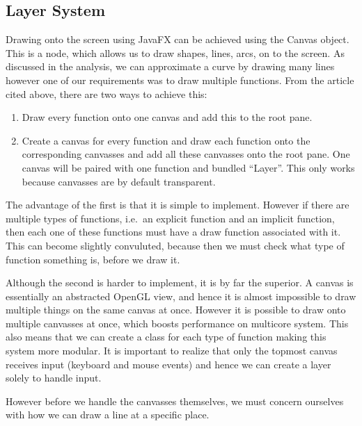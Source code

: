 \documentclass[../../../../../main.tex]{subfiles}
\begin{document}
\subsection{Layer System}
Drawing onto the screen using JavaFX can be achieved using the Canvas\cite{canvas} object. This is a node, which allows us to draw shapes, lines, arcs, on to the screen. As discussed in the analysis, we can approximate a curve by drawing many lines however one of our requirements was to draw multiple functions. From the article cited above, there are two ways to achieve this:
\begin{enumerate}
	\item Draw every function onto one canvas and add this to the root pane.
	\item Create a canvas for every function and draw each function onto the corresponding canvasses and add all these canvasses onto the root pane. One canvas will be paired with one function and bundled ``Layer''. This only works because canvasses are by default transparent.
\end{enumerate}
The advantage of the first is that it is simple to implement. However if there are multiple types of functions, i.e.\ an explicit function and an implicit function, then each one of these functions must have a draw function associated with it. This can become slightly convuluted, because then we must check what type of function something is, before we draw it.

Although the second is harder to implement, it is by far the superior. A canvas is essentially an abstracted OpenGL view, and hence it is almost impossible\cite{openglMultithread} to draw multiple things on the same canvas at once. However it is possible to draw onto multiple canvasses at once, which boosts performance on multicore system. This also means that we can create a class for each type of function making this system more modular. It is important to realize that only the topmost canvas receives input (keyboard and mouse events) and hence we can create a layer solely to handle input.

However before we handle the canvasses themselves, we must concern ourselves with how we can draw a line at a specific place.
\end{document}
